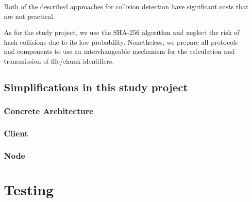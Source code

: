 Both of the described approaches for collision detection have significant costs that are not practical.

As for the study project, we use the SHA-256 algorithm\cite{sha-256} and neglect the risk of hash collisions due to its low probability. Nonetheless, we prepare all protocols and components to use an interchangeable mechanism for the calculation and transmission of file/chunk identifiers.

\subsection{Simplifications in this study project}
\subsubsection{Concrete Architecture}

\subsubsection{Client}
\subsubsection{Node}
\section{Testing}\label{testing}
